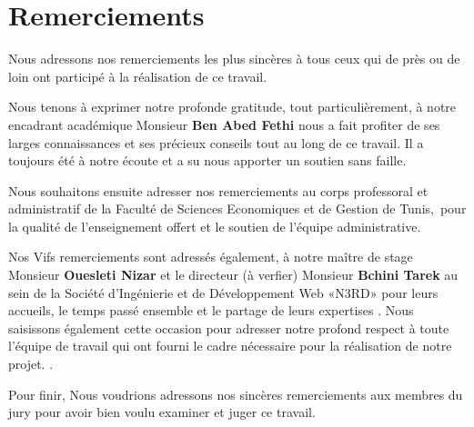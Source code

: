\chapter*{Remerciements}

Nous adressons nos remerciements les plus sincères à  tous ceux qui de près ou de loin ont participé à la réalisation de ce travail. 

\medskip

Nous tenons à exprimer notre profonde gratitude, tout particulièrement,  à notre encadrant académique Monsieur \textbf{Ben Abed Fethi} nous a fait profiter de ses larges connaissances et ses précieux conseils tout au long de ce travail. Il a toujours été à notre écoute et a su nous apporter un soutien sans faille.

\medskip


Nous souhaitons ensuite adresser nos remerciements au corps professoral et administratif de la Faculté de Sciences Economiques et de Gestion de Tunis, pour la qualité de l’enseignement offert et le soutien de l’équipe administrative.
\medskip

Nos Vifs remerciements sont adressés également, à notre maître de stage Monsieur \textbf{Ouesleti Nizar} et le directeur (à verfier) Monsieur \textbf{Bchini Tarek}  au sein de la Société d'Ingénierie et de Développement Web «N3RD» pour leurs accueils, le temps passé ensemble et le partage de leurs expertises . 
Nous saisissons également cette occasion pour adresser notre profond respect à toute l'équipe de travail qui ont fourni le cadre nécessaire pour la réalisation de notre projet.
.
\medskip

Pour finir, Nous voudrions adressons nos sincères remerciements aux membres du jury pour avoir bien voulu examiner et juger ce travail. \\[1cm]





\clearpage